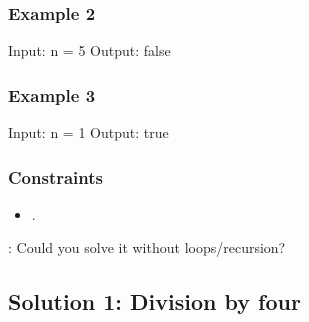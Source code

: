 \documentclass[letterpaper,12pt,english]{book}
\begin{document}
\subsubsection{Example 2}
\label{\detokenize{Mathematics/09_MTH_342_Power_of_Four:example-2}}
\begin{sphinxVerbatim}[commandchars=\\\{\}]
Input: n = 5
Output: false
\end{sphinxVerbatim}


\subsubsection{Example 3}
\label{\detokenize{Mathematics/09_MTH_342_Power_of_Four:example-3}}
\begin{sphinxVerbatim}[commandchars=\\\{\}]
Input: n = 1
Output: true
\end{sphinxVerbatim}


\subsubsection{Constraints}
\label{\detokenize{Mathematics/09_MTH_342_Power_of_Four:constraints}}\begin{itemize}
\item {} 
\sphinxAtStartPar
{}.

\end{itemize}

\sphinxAtStartPar
{}: Could you solve it without loops/recursion?


\subsection{Solution 1: Division by four}
\label{\detokenize{Mathematics/09_MTH_342_Power_of_Four:solution-1-division-by-four}}
\end{document}
